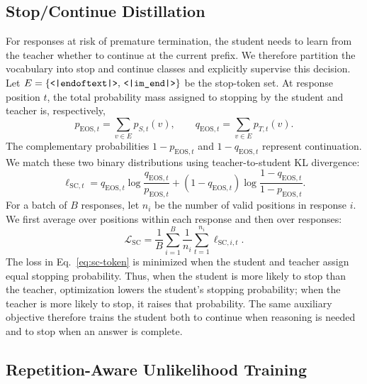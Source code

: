 \documentclass{article} %
\begin{document}
\subsection{Stop/Continue Distillation}
\label{sec:stop-continue}

For responses at risk of premature termination, the student needs to learn from the teacher whether to continue at the current prefix. We therefore partition the vocabulary into stop and continue classes and explicitly supervise this decision. Let $E=\{\text{\texttt{\detokenize{<|endoftext|>}}},\,\text{\texttt{\detokenize{<|im_end|>}}}\}$ be the stop-token set.
At response position $t$, the total probability mass assigned to stopping by the student and teacher is, respectively,
\begin{equation}
p_{\mathrm{EOS},t}
=
\sum_{v\in E}p_{S,t}(v),
\qquad
q_{\mathrm{EOS},t}
=
\sum_{v\in E}p_{T,t}(v).
\label{eq:stop-mass}
\end{equation}
The complementary probabilities $1-p_{\mathrm{EOS},t}$ and $1-q_{\mathrm{EOS},t}$ represent continuation. We match these two binary distributions using teacher-to-student KL divergence:
\begin{equation}
\ell_{\mathrm{SC},t}
=
q_{\mathrm{EOS},t}
\log\frac{q_{\mathrm{EOS},t}}{p_{\mathrm{EOS},t}}
+
(1-q_{\mathrm{EOS},t})
\log\frac{1-q_{\mathrm{EOS},t}}{1-p_{\mathrm{EOS},t}}.
\label{eq:sc-token}
\end{equation}
For a batch of $B$ responses, let $n_i$ be the number of valid positions in response $i$. We first average over positions within each response and then over responses:
\begin{equation}
\mathcal L_{\mathrm{SC}}
=
\frac{1}{B}
\sum_{i=1}^{B}
\frac{1}{n_i}
\sum_{t=1}^{n_i}
\ell_{\mathrm{SC},i,t}.
\label{eq:sc-reduction}
\end{equation}
The loss in Eq.~\ref{eq:sc-token} is minimized when the student and teacher assign equal stopping probability. Thus, when the student is more likely to stop than the teacher, optimization lowers the student's stopping probability; when the teacher is more likely to stop, it raises that probability. The same auxiliary objective therefore trains the student both to continue when reasoning is needed and to stop when an answer is complete.

\subsection{Repetition-Aware Unlikelihood Training}
\label{sec:ul-method}
\end{document}

